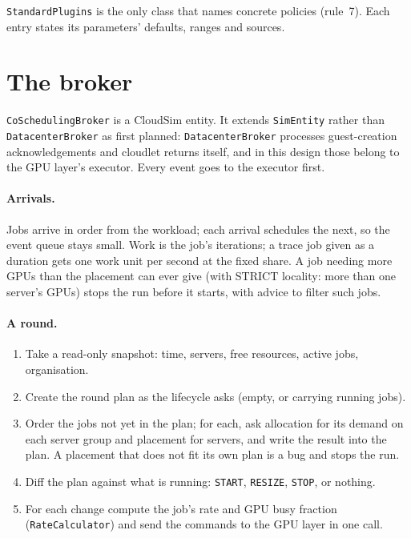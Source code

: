 \documentclass[11pt,a4paper]{article}
\newcommand{\code}[1]{\texttt{#1}}
\begin{document}
\code{StandardPlugins} is the only class that names concrete policies (rule~7). Each entry states
its parameters' defaults, ranges and sources.

\section{The broker}

\code{CoSchedulingBroker} is a CloudSim entity. It extends \code{SimEntity} rather than
\code{DatacenterBroker} as first planned: \code{DatacenterBroker} processes guest-creation
acknowledgements and cloudlet returns itself, and in this design those belong to the GPU layer's
executor. Every event goes to the executor first.

\paragraph{Arrivals.} Jobs arrive in order from the workload; each arrival schedules the next, so the
event queue stays small. Work is the job's iterations; a trace job given as a duration gets one work
unit per second at the fixed share. A job needing more GPUs than the placement can ever give (with
STRICT locality: more than one server's GPUs) stops the run before it starts, with advice to filter
such jobs.

\paragraph{A round.}
\begin{enumerate}
  \item Take a read-only snapshot: time, servers, free resources, active jobs, organisation.
  \item Create the round plan as the lifecycle asks (empty, or carrying running jobs).
  \item Order the jobs not yet in the plan; for each, ask allocation for its demand on each server
        group and placement for servers, and write the result into the plan. A placement that does
        not fit its own plan is a bug and stops the run.
  \item Diff the plan against what is running: \code{START}, \code{RESIZE}, \code{STOP}, or nothing.
  \item For each change compute the job's rate and GPU busy fraction (\code{RateCalculator}) and send
        the commands to the GPU layer in one call.
\end{enumerate}
\end{document}
